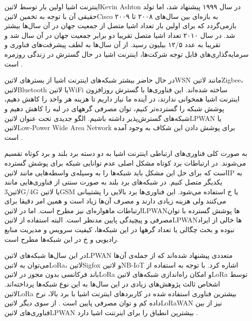 
اینترنت اشیا اولین بار توسط ‌لاتین{Kevin Ashton} در سال ۱۹۹۹ پیشنهاد شد، اما تولد حقیقی آن
با توجه به تخمین ‌لاتین{Cisco} به بازه‌ای بین سال‌های ۲۰۰۸ تا ۲۰۰۹ بازمی‌گردد که برای اولین بار تعداد اشیا
متصل از جمعیت جهان در آن سال‌ها بیشتر شد. در سال ۲۰۱۰ تعداد اشیا متصل تقریبا دو برابر جمعیت جهان در آن سال شد و تقریبا به عدد ۱۲/۵ بیلیون رسید.
از آن سال‌ها به لطف پیشرفت‌های فناوری و سرمایه‌گذاری‌های قابل توجه شرکت‌ها، اینترنت اشیا در حال گسترش در زندگی روزمره است
.

در حال حاضر بیشتر شبکه‌های اینترنت اشیا از بسترهای ‌لاتین{WSN} مانند ‌لاتین{Zigbee}، ‌لاتین{Bluetooth} یا ‌لاتین{WiFi} ساخته شده‌اند.
این فناوری‌ها با گسترش روزافزون اینترنت اشیا همخوانی ندارند، در آینده ما نیاز داریم تا هزینه هر واحد را کاهش دهیم، پوشش شبکه را گسترده‌تر کنیم، توان مصرفی گرههای در لبه را کاهش دهیم و شبکه‌های گسترش‌پذیر داشته باشیم.
الگو جدیدی تحت عنوان ‌لاتین{LPWAN} یا ‌لاتین{Low-Power Wide Area Network} برای پوشش دادن این شکاف به وجود آمده است .

به صورت کلی فناوری‌های ارتباطی اینترنت اشیا به دو دسته برد بلند و برد کوتاه تقسیم می‌شوند. در ارتباطات برد کوتاه مشکل اصلی عدم توانایی شبکه برای پوشش گسترده است
که برای حل این مشکل باید شبکه‌ها را به وسیله‌ی واسطه‌هایی مانند ‌لاتین{IP} به یکدیگر متصل کنیم.
در شبکه‌های برد بلند به صورت سنتی از فناوری‌هایی مانند ‌لاتین{3G/4G} یا ‌لاتین{GSM} یا ‌خ استفاده می‌شود.
این فناوری‌ها برد بالایی را پشتیبانی می‌کنند ولی هزینه زیادی دارند و مصرف آن‌ها زیاد است و همین امر دقیقا برای ارتباطات ماهواره‌ای نیز مطرح است. اما در ‌لاتین{LPWAN}ها پوشش گسترده با توان مصرفی و پیچیدگی پایین مدنظر است.
البته استفاده از ‌لاتین{LPWAN}ها خالی از ایراد نبوده و بحث چگالی یا تعداد گرهها در این شبکه‌ها، کیفیت سرویس و مدیریت منابع رادیویی و ‌خ در این شبکه‌ها مطرح است.

در این سال‌ها شبکه‌های ‌لاتین{LPWAN} متعددی پیشنهاد شده‌اند که از جمله‌ی آن‌ها می‌توان به ‌لاتین{LoRa}، ‌لاتین{Sigfox} و ‌لاتین{NB-IoT} اشاره کرد.
با توجه به استفاده از باند فرکانسی بدون مجوز در ‌لاتین{LoRa} و امکان راه‌اندازی شبکه‌های ‌لاتین{LoRa} توسط اشخاص ثالث پژوهش‌های زیادی در این سال‌ها به این نوع شبکه‌ها پرداخته‌اند.
‌لاتین{LoRa} بیشترین فناوری استفاده شده در کاربردهای اینترنت اشیا با برد بالا، نرخ داده کم و توان مصرفی پایین است .
از سوی دیگر ‌لاتین{LoRaWAN} نیز از بین فناوری‌های ‌لاتین{LPWAN} بیشترین انطباق را برای اینرتنت اشیا دارد .

